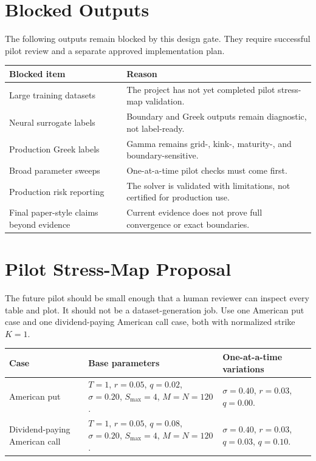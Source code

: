 \documentclass[11pt,a4paper]{article}
\begin{document}
\section{Blocked Outputs}

The following outputs remain blocked by this design gate. They require successful pilot review
and a separate approved implementation plan.

\begin{longtable}{L{0.31\textwidth} L{0.54\textwidth}}
\toprule
Blocked item & Reason \\
\midrule
\endhead
Large training datasets & The project has not yet completed pilot stress-map validation. \\
Neural surrogate labels & Boundary and Greek outputs remain diagnostic, not label-ready. \\
Production Greek labels & Gamma remains grid-, kink-, maturity-, and boundary-sensitive. \\
Broad parameter sweeps & One-at-a-time pilot checks must come first. \\
Production risk reporting & The solver is validated with limitations, not certified for production use. \\
Final paper-style claims beyond evidence & Current evidence does not prove full convergence or exact boundaries. \\
\bottomrule
\end{longtable}

\section{Pilot Stress-Map Proposal}

The future pilot should be small enough that a human reviewer can inspect every table and plot.
It should not be a dataset-generation job. Use one American put case and one dividend-paying
American call case, both with normalized strike \(K=1\).

\begin{longtable}{L{0.28\textwidth} L{0.26\textwidth} L{0.35\textwidth}}
\toprule
Case & Base parameters & One-at-a-time variations \\
\midrule
\endhead
American put & \(T=1\), \(r=0.05\), \(q=0.02\), \(\sigma=0.20\), \(S_{\max}=4\), \(M=N=120\). & \(\sigma=0.40\), \(r=0.03\), \(q=0.00\). \\
Dividend-paying American call & \(T=1\), \(r=0.05\), \(q=0.08\), \(\sigma=0.20\), \(S_{\max}=4\), \(M=N=120\). & \(\sigma=0.40\), \(r=0.03\), \(q=0.03\), \(q=0.10\). \\
\bottomrule
\end{longtable}
\end{document}
